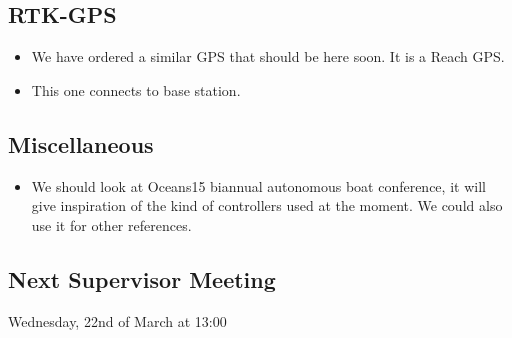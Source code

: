 \subsection{RTK-GPS}
\begin{itemize}
	\item We have ordered a similar GPS that should be here soon. It is a Reach GPS.
	\item This one connects to base station.
\end{itemize}
\subsection{Miscellaneous}
\begin{itemize}
	\item We should look at Oceans15 biannual autonomous boat conference, it will give inspiration of the kind of controllers used at the moment. We could also use it for other references.
\end{itemize}
\subsection{Next Supervisor Meeting}
Wednesday, 22nd of March at 13:00

